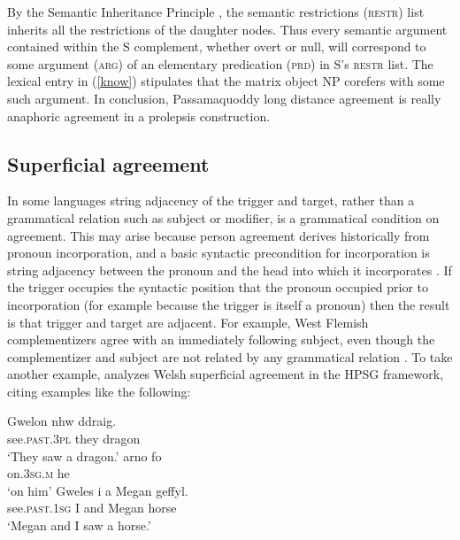 \documentclass[output=paper]{langsci/langscibook}
\begin{document}
\noindent
By the Semantic Inheritance Principle \citep{Sag+etal:2003}, the semantic restrictions (\textsc{restr}) list inherits all the restrictions of the daughter nodes.  Thus every semantic argument contained within the S complement, whether overt or null, will correspond to some argument (\textsc{arg}) of an elementary predication (\textsc{prd}) in S's \textsc{restr} list.  The lexical entry in (\ref{know}) stipulates that the matrix object NP corefers with some such argument.    In conclusion, Passamaquoddy long distance agreement is really anaphoric agreement in a prolepsis construction.  


\subsection{Superficial agreement}

 In some languages string adjacency of the trigger and target, rather than a grammatical relation such as subject or modifier, is a grammatical condition on agreement. This may arise because person agreement derives historically from pronoun incorporation, and a basic syntactic precondition for incorporation is string adjacency between the pronoun and the head into which it incorporates \citep{givon:1976,ariel:1999,wechsler+epps+coppock:2010,fuss:2005}.  If the trigger occupies the syntactic position that the pronoun occupied prior to incorporation (for example because the trigger is itself a pronoun) then the result is that trigger and target are adjacent.  For example, West Flemish complementizers agree with an immediately following subject, even though the complementizer and subject are not related by any grammatical relation \citep{Haegeman:1992}.  To take another example, \citet{Borsley:2009} analyzes Welsh superficial agreement in the HPSG framework, citing examples like the following:

\begin{exe}
\ex \label{welsh}
\begin{xlist}
\ex
\gll 	Gwelon nhw ddraig. \\
see.\textsc{past.3pl} they dragon \\
\glt ‘They saw a dragon.’
\ex 
\gll 	arno fo \\
on.\textsc{3sg.m} he \\
\glt ‘on him’
\ex 
\gll 	Gweles i a Megan geffyl. \\
see.\textsc{past.1sg} I and Megan horse \\
\glt ‘Megan and I saw a horse.’
\end{xlist}
\end{exe}
\end{document}
